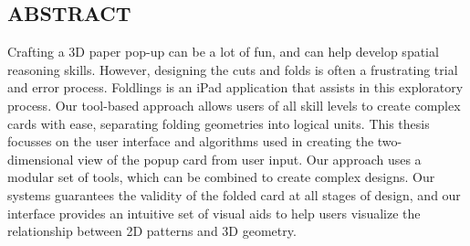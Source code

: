 \pagestyle{plain}
\begin{center}


\section*{ABSTRACT}


\end{center}
Crafting a 3D paper pop-up can be a lot of fun, and can help develop spatial reasoning skills.  However, designing the cuts and folds is often a frustrating trial and error process.  Foldlings is an iPad application that assists in this exploratory process.   Our tool-based approach allows users of all skill levels to create complex cards with ease, separating folding geometries into logical units.  This thesis focusses on the user interface and algorithms used in creating the two-dimensional view of the popup card from user input.
Our approach uses a modular set of tools, which can be combined to create complex designs.  Our systems guarantees the validity of the folded card at all stages of design, and our interface provides an intuitive set of visual aids to help users visualize the relationship between 2D patterns and 3D geometry.

\cleardoublepage
